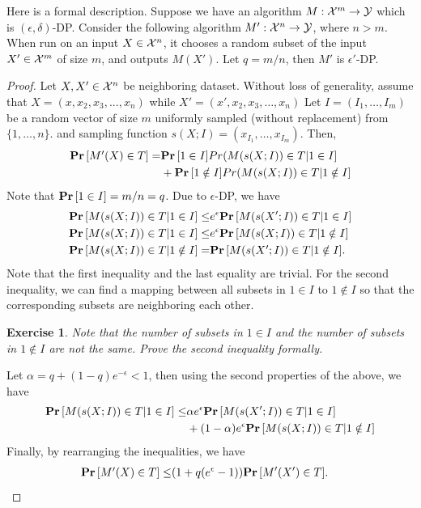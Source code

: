 \documentclass[11pt, a4paper]{article}
\newtheorem{exercise}{Exercise}
\begin{document}
Here is a formal description.
Suppose we have an algorithm $M : {\cal X}^m \rightarrow {\cal Y}$ which is $(\epsilon, \delta)$-DP.
Consider the following algorithm $M':{\cal X}^n\rightarrow {\cal Y}$, where $n > m$.
When run on an input $X \in{\cal X}^n$, it chooses a random subset of the input $X'\in{\cal X}^m$ of size $m$, and outputs $M(X')$.
Let $q= m/n$, then $M'$ is $\epsilon'$-DP.\\
\begin{proof}
Let $X, X'\in {\cal X}^n$ be neighboring dataset.
Without loss of generality, assume that $X= (x, x_2, x_3, ..., x_n)$ while $X'=(x', x_2, x_3, \dots, x_n)$
Let $I=(I_1, \dots, I_m)$ be a random vector of size $m$ uniformly sampled (without replacement) from $\{1, \dots, n\}$.
and sampling function $s(X;I) = (x_{I_1}, \dots, x_{I_m})$.
Then,
\begin{align*}
    \Prob{M'(X)\in T} =& \Prob{1\in I] Pr(M(s(X;I))\in T|1\in I}\\
    &+ \Prob{1\notin I] Pr(M(s(X;I))\in T|1\notin I}
\end{align*}
Note that $\Prob{1\in I} = m/n=q$.
Due to $\epsilon$-DP, we have
\begin{align*}
\Prob{M(s(X;I))\in T|1\in I} \leq& e^\epsilon \Prob{M(s(X';I))\in T|1\in I}\\
\Prob{M(s(X;I))\in T|1\in I} \leq& e^\epsilon \Prob{M(s(X;I))\in T|1\notin I}\\
\Prob{M(s(X;I))\in T|1\notin I} =& \Prob{M(s(X';I))\in T|1\notin I}.
\end{align*}
Note that the first inequality and the last equality are trivial.
For the second inequality, we can find a mapping between all subsets in $1\in I$ to $1\notin I$
so that the corresponding subsets are neighboring each other.

\begin{exercise}
    Note that the number of subsets in $1\in I$ and the number of subsets in $1\notin I$ are not the same.
    Prove the second inequality formally.
\end{exercise}


Let $\alpha = q + (1-q)e^{-\epsilon}<1$, then using the second properties of the above, we have
\begin{align*}
\Prob{M(s(X;I))\in T|1\in I} \leq& \alpha e^\epsilon \Prob{M(s(X';I))\in T|1\in I} \\
&+ (1-\alpha) e^\epsilon \Prob{M(s(X;I))\in T|1\notin I} 
\end{align*}
Finally, by rearranging the inequalities, we have
\begin{align*}
    \Prob{M'(X)\in T} \leq &(1+q(e^\epsilon-1)) \Prob{M'(X')\in T}.
\end{align*}
\end{proof}
\end{document}
